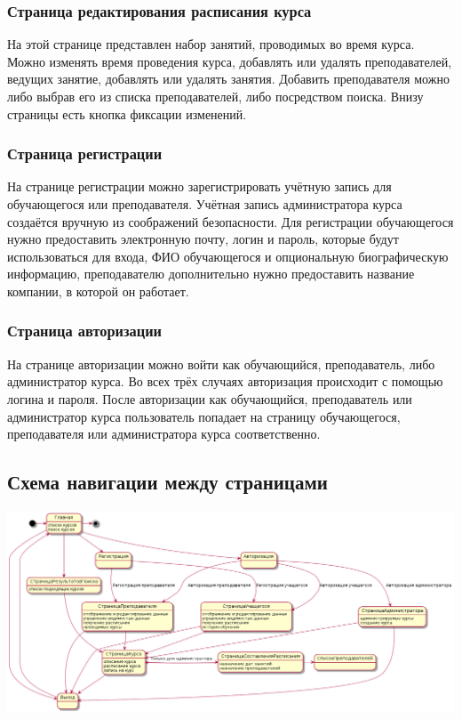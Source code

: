 \documentclass[11pt]{article}
\begin{document}
\subsubsection{Страница редактирования расписания курса}
\label{sec:org49123b6}
На этой странице представлен набор занятий, проводимых во время курса. Можно изменять время
проведения курса, добавлять или удалять преподавателей, ведущих занятие, добавлять или удалять
занятия. Добавить преподавателя можно либо выбрав его из списка преподавателей, либо
посредством поиска. Внизу страницы есть кнопка фиксации изменений.
\subsubsection{Страница регистрации}
\label{sec:org3de71c3}
На странице регистрации можно зарегистрировать учётную запись для обучающегося или преподавателя.
Учётная запись администратора курса создаётся вручную из соображений безопасности.
Для регистрации обучающегося нужно предоставить электронную почту, логин и пароль, которые
будут использоваться для входа, ФИО обучающегося и опциональную биографическую информацию,
преподавателю дополнительно нужно предоставить название компании, в которой он работает.
\subsubsection{Страница авторизации}
\label{sec:orgd19dc19}
На странице авторизации можно войти как обучающийся, преподаватель, либо администратор курса.
Во всех трёх случаях авторизация происходит с помощью логина и пароля. После авторизации как
обучающийся, преподаватель или администратор курса пользователь попадает на страницу
обучающегося, преподавателя или администратора курса соответственно.
\subsection{Схема навигации между страницами}
\label{sec:org544dab5}
\begin{center}
\includegraphics[width=.9\linewidth]{pages.png}
\end{center}
\end{document}
